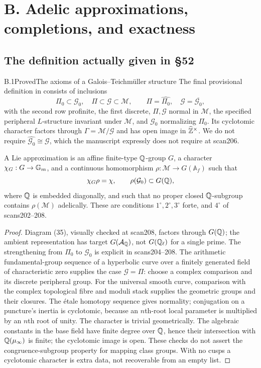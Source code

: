 \section{B. Adelic approximations, completions, and exactness}
\subsection{The definition actually given in \S52}

\begin{statement}{B.1}{Proved}{The axioms of a Galois--Teichm\"uller structure}
The final provisional definition in 
consists of inclusions
\[
 \Pi_0\subset\mathcal G_0,\quad \Pi\subset\mathcal G\subset\mathcal M,
 \qquad \Pi=\widehat{\Pi_0},\quad \mathcal G=\overline{\mathcal G_0},
\]
with the second row profinite, the first discrete, $\Pi,\mathcal G$ normal
in $\mathcal M$, the specified peripheral $L$-structure invariant under
$\mathcal M$, and $\mathcal G_0$ normalizing $\Pi_0$. Its cyclotomic
character factors through $\Gamma=\mathcal M/\mathcal G$ and has open
image in $\widehat{\mathbb Z}^\times$. We do not require
$\widehat{\mathcal G_0}\cong\mathcal G$, which the manuscript expressly
does not require at scan206.

A Lie approximation is an affine finite-type $\mathbb Q$-group $G$, a character
$\chi_G:G\to\mathbb G_m$, and a continuous homomorphism
$\rho:\mathcal M\to G(\mathbb A_f)$ such that
\[
 \chi_G\rho=\chi,\qquad \rho(\mathcal G_0)\subset G(\mathbb Q),
\]
where $\mathbb Q$ is embedded diagonally, and such that no proper closed
$\mathbb Q$-subgroup contains $\rho(\mathcal M)$ adelically.
These are conditions $1^\circ,2^\circ,3^\circ$ forte, and $4^\circ$
of scans202--208.
\end{statement}
\begin{proof}
Diagram (35), visually checked at scan208, factors through $G(\mathbb Q)$;
the ambient representation has target $G(\mathcal A_\mathbb Q)$, not
$G(\mathbb Q_\ell)$ for a single prime. The strengthening from $\Pi_0$
to $\mathcal G_0$ is explicit in scans204--208.
The arithmetic fundamental-group sequence of a hyperbolic curve over a
finitely generated field of characteristic zero supplies the case
$\mathcal G=\Pi$: choose a complex comparison and its discrete
peripheral group. For the universal smooth curve, comparison with
the complex topological fibre and moduli stack supplies the
geometric groups and their closures. The étale homotopy sequence
gives normality; conjugation on a puncture's inertia is cyclotomic,
because an $n$th-root local parameter is multiplied by an $n$th
root of unity. The character is trivial geometrically. The algebraic
constants in the base field have finite degree over $\mathbb Q$, hence
their intersection with $\mathbb Q(\mu_\infty)$ is finite; the cyclotomic
image is open. These checks do not assert the congruence-subgroup
property for mapping class groups. With no cusps a cyclotomic
character is extra data, not recoverable from an empty list.
\end{proof}

